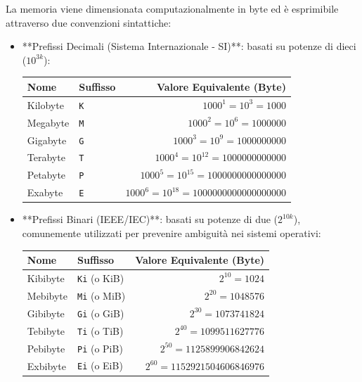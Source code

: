 \documentclass[11pt, a4paper]{article}
\begin{document}
La memoria viene dimensionata computazionalmente in byte ed è esprimibile attraverso due convenzioni sintattiche:
\begin{itemize}
    \item **Prefissi Decimali (Sistema Internazionale - SI)**: basati su potenze di dieci ($10^{3k}$):
    \begin{center}
    \begin{tabular}{llr}
        \toprule
        \textbf{Nome} & \textbf{Suffisso} & \textbf{Valore Equivalente (Byte)} \\
        \midrule
        Kilobyte & \texttt{K} & $1000^1 = 10^3 = \num{1000}$ \\
        Megabyte & \texttt{M} & $1000^2 = 10^6 = \num{1000000}$ \\
        Gigabyte & \texttt{G} & $1000^3 = 10^9 = \num{1000000000}$ \\
        Terabyte & \texttt{T} & $1000^4 = 10^{12} = \num{1000000000000}$ \\
        Petabyte & \texttt{P} & $1000^5 = 10^{15} = \num{1000000000000000}$ \\
        Exabyte  & \texttt{E} & $1000^6 = 10^{18} = \num{1000000000000000000}$ \\
        \bottomrule
    \end{tabular}
    \end{center}

    \item **Prefissi Binari (IEEE/IEC)**: basati su potenze di due ($2^{10k}$), comunemente utilizzati per prevenire ambiguità nei sistemi operativi:
    \begin{center}
    \begin{tabular}{llr}
        \toprule
        \textbf{Nome} & \textbf{Suffisso} & \textbf{Valore Equivalente (Byte)} \\
        \midrule
        Kibibyte & \texttt{Ki} (o KiB) & $2^{10} = \num{1024}$ \\
        Mebibyte & \texttt{Mi} (o MiB) & $2^{20} = \num{1048576}$ \\
        Gibibyte & \texttt{Gi} (o GiB) & $2^{30} = \num{1073741824}$ \\
        Tebibyte & \texttt{Ti} (o TiB) & $2^{40} = \num{1099511627776}$ \\
        Pebibyte & \texttt{Pi} (o PiB) & $2^{50} = \num{1125899906842624}$ \\
        Exbibyte & \texttt{Ei} (o EiB) & $2^{60} = \num{1152921504606846976}$ \\
        \bottomrule
    \end{tabular}
    \end{center}
\end{itemize}
\end{document}
